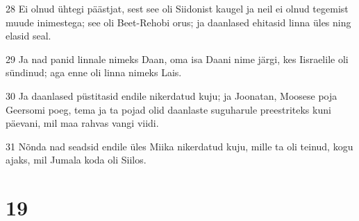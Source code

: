 \par 28 Ei olnud ühtegi päästjat, sest see oli Siidonist kaugel ja neil ei olnud tegemist muude inimestega; see oli Beet-Rehobi orus; ja daanlased ehitasid linna üles ning elasid seal.
\par 29 Ja nad panid linnale nimeks Daan, oma isa Daani nime järgi, kes Iisraelile oli sündinud; aga enne oli linna nimeks Lais.
\par 30 Ja daanlased püstitasid endile nikerdatud kuju; ja Joonatan, Moosese poja Geersomi poeg, tema ja ta pojad olid daanlaste suguharule preestriteks kuni päevani, mil maa rahvas vangi viidi.
\par 31 Nõnda nad seadsid endile üles Miika nikerdatud kuju, mille ta oli teinud, kogu ajaks, mil Jumala koda oli Siilos.

\chapter{19}

